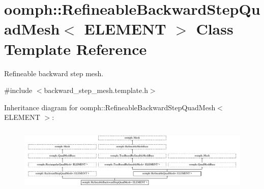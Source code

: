 \hypertarget{classoomph_1_1RefineableBackwardStepQuadMesh}{}\section{oomph\+:\+:Refineable\+Backward\+Step\+Quad\+Mesh$<$ E\+L\+E\+M\+E\+NT $>$ Class Template Reference}
\label{classoomph_1_1RefineableBackwardStepQuadMesh}


Refineable backward step mesh.  




{\ttfamily \#include $<$backward\+\_\+step\+\_\+mesh.\+template.\+h$>$}

Inheritance diagram for oomph\+:\+:Refineable\+Backward\+Step\+Quad\+Mesh$<$ E\+L\+E\+M\+E\+NT $>$\+:\begin{figure}[H]
\begin{center}
\leavevmode
\includegraphics[height=3.218391cm]{classoomph_1_1RefineableBackwardStepQuadMesh}
\end{center}
\end{figure}
